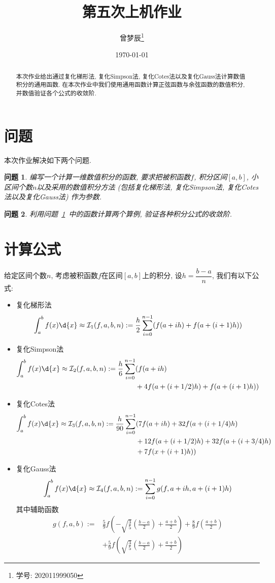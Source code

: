 \documentclass[a4paper]{ctexart}
\title{第五次上机作业}
\author{曾梦辰\thanks{学号: 202011999050}}
\date{\today}
\theoremstyle{plain}
\newtheorem{pro}{问题}
\theoremstyle{remark}
\numberwithin{equation}{section}
\begin{document}
\maketitle

\begin{abstract}
    本次作业给出通过复化梯形法, 复化Simpson法, 复化Cotes法以及复化Gauss法计算数值积分的通用函数.
    在本次作业中我们使用通用函数计算正弦函数与余弦函数的数值积分, 并数值验证各个公式的收敛阶.
\end{abstract}

\section{问题}
本次作业解决如下两个问题.
\begin{pro}\label{pro1}
    编写一个计算一维数值积分的函数, 要求把被积函数$f$, 积分区间$[a,b]$, 小区间个数$n$以及采用的数值积分方法 (包括复化梯形法, 复化Simpson法, 复化Cotes法以及复化Gauss法) 作为参数.
\end{pro}

\begin{pro}
    利用问题~\ref{pro1}~中的函数计算两个算例, 验证各种积分公式的收敛阶.
\end{pro}

\section{计算公式}
给定区间个数$n$, 考虑被积函数$f$在区间$[a,b]$上的积分, 设$h=\dfrac{b-a}{n}$, 我们有以下公式:
\begin{itemize}
    \item 复化梯形法
    \[\int_a^bf(x)\d{x}\approx\mathcal{I}_1(f,a,b,n):=\frac{h}{2}\sum_{i=0}^{n-1}(f(a+ih)+f(a+(i+1)h))\]
    \item 复化Simpson法
    \begin{align*}
        \int_a^bf(x)\d{x}\approx\mathcal{I}_2(f,a,b,n):=\frac{h}{6}\sum_{i=0}^{n-1}&(f(a+ih)\\
        &+4f(a+(i+1/2)h)+f(a+(i+1)h))
    \end{align*}
    \item 复化Cotes法
    \begin{align*}
        \int_a^bf(x)\d{x}\approx\mathcal{I}_3(f,a,b,n):=\frac{h}{90}\sum_{i=0}^{n-1}&(7f(a+ih)+32f(a+(i+1/4)h)\\
        &+12f(a+(i+1/2)h)+32f(a+(i+3/4)h)\\
        &+7f(x+(i+1)h))
    \end{align*}
    \item 复化Gauss法
    \[\int_a^bf(x)\d{x}\approx\mathcal{I}_4(f,a,b,n):=\sum_{i=0}^{n-1}g(f,a+ih,a+(i+1)h)\]
    其中辅助函数
    \begin{align*}
        g(f,a,b):=&\frac{5}{9}f\left(-\sqrt{\frac{3}{5}}\left(\frac{b-a}{2}\right)+\frac{a+b}{2}\right)+\frac{8}{9}f\left(\frac{a+b}{2}\right)\\
        &+\frac{5}{9}f\left(\sqrt{\frac{3}{5}}\left(\frac{b-a}{2}\right)+\frac{a+b}{2}\right)
    \end{align*}
\end{itemize}
\end{document}
